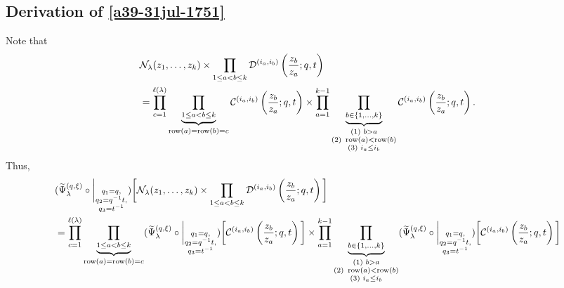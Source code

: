 \documentclass[12pt,reqno,a4paper]{amsart}
\newcommand{\comp}{\circ}
\newcommand{\cals}[1]{\mathcal{#1}}
\numberwithin{equation}{section}
\newcommand{\dualmap}{
\widetilde{\Psi}^{(q,\xi)}_{\lambda}
}
\theoremstyle{definition}
\begin{document}
\subsection{Derivation of \eqref{a39-31jul-1751}}



Note that 
\footnotesize
\begin{align}
	&\cals{N}_\lambda(z_1,\dots,z_k)
	\times 
	\prod_{1 \leq a < b \leq k}
	\cals{D}^{(i_a,i_b)}\left(
	\frac{z_b}{z_a}
	; q, t
	\right)
	\\
	&= 
	\prod_{c = 1}^{\ell(\lambda)}
	\underbrace{		\prod_{1 \leq a < b \leq k}				}_{
		\operatorname{row}(a) = \operatorname{row}(b) = c
	}
	\cals{C}^{(i_a,i_b)}\left(
	\frac{z_b}{z_a}
	; q, t
	\right)
	\times 
	\prod_{a = 1}^{k - 1}
	\underbrace{		\prod_{b \in \{1,\dots,k\}}				}_{
		\substack{
			(1) \,\, b > a 
			\\
			(2) \,\, \operatorname{row}(a) < \operatorname{row}(b)
			\\
			(3) \,\, i_a \leq i_b
		}
	}
	\cals{C}^{(i_a,i_b)}\left(
	\frac{z_b}{z_a}
	; q, t
	\right).
	\notag  
\end{align}
\normalsize
Thus, 
\footnotesize
\begin{align}
	&(
	\dualmap
	\comp 
	\bigg|_{
		\substack{
			q_1 = q, \\
			q_2 = q^{-1}t,\\
			q_3 = t^{-1} \\
		}
	}
	)
	\bigg[
	\cals{N}_\lambda(z_1,\dots,z_k)
	\times
	\prod_{1 \leq a < b \leq k}
	\cals{D}^{(i_a,i_b)}\left(
	\frac{z_b}{z_a}
	; q, t
	\right)
	\bigg]
	\\
	&= 
	\prod_{c = 1}^{\ell(\lambda)}
	\underbrace{		\prod_{1 \leq a < b \leq k}				}_{
		\operatorname{row}(a) = \operatorname{row}(b) = c
	}
	(
	\dualmap
	\comp 
	\bigg|_{
		\substack{
			q_1 = q, \\
			q_2 = q^{-1}t,\\
			q_3 = t^{-1} \\
		}
	}
	)
	\bigg[
	\cals{C}^{(i_a,i_b)}\left(
	\frac{z_b}{z_a}
	; q, t
	\right)
	\bigg]
	\times 
	\prod_{a = 1}^{k - 1}
	\underbrace{		\prod_{b \in \{1,\dots,k\}}				}_{
		\substack{
			(1) \,\, b > a 
			\\
			(2) \,\, \operatorname{row}(a) < \operatorname{row}(b)
			\\
			(3) \,\, i_a \leq i_b
		}
	}
	(
	\dualmap
	\comp 
	\bigg|_{
		\substack{
			q_1 = q, \\
			q_2 = q^{-1}t,\\
			q_3 = t^{-1} \\
		}
	}
	)
	\bigg[
	\cals{C}^{(i_a,i_b)}\left(
	\frac{z_b}{z_a}
	; q, t
	\right)
	\bigg]
	\notag 
\end{align}
\normalsize
\end{document}
